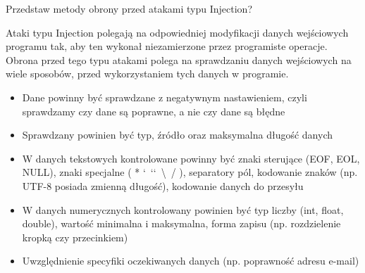 \documentclass[answers,11pt]{exam}
\begin{document}
\begin{questions}
\question Przedstaw metody obrony przed atakami typu Injection?
\begin{solution}
Ataki typu Injection polegają na odpowiedniej modyfikacji danych wejściowych programu tak, aby ten wykonał niezamierzone przez programiste operacje.
Obrona przed tego typu atakami polega na sprawdzaniu danych wejściowych na wiele sposobów, przed wykorzystaniem tych danych w programie.
\begin{itemize}
\item Dane powinny być sprawdzane z negatywnym nastawieniem, czyli sprawdzamy czy dane są poprawne, a nie czy dane są błędne
\item Sprawdzany powinien być typ, źródło oraz maksymalna długość danych
\item W danych tekstowych kontrolowane powinny być znaki sterujące (EOF, EOL, NULL), znaki specjalne ( * \lq\ \lq\lq\ \textbackslash\ / ), separatory pól, kodowanie znaków (np. UTF-8 posiada zmienną długość), kodowanie danych do przesyłu
\item W danych numerycznych kontrolowany powinien być typ liczby (int, float, double), wartość minimalna i maksymalna, forma zapisu (np. rozdzielenie kropką czy przecinkiem)
\item Uwzględnienie specyfiki oczekiwanych danych (np. poprawność adresu e-mail)
\end{itemize}
\end{solution}


\end{questions}
\end{document}
